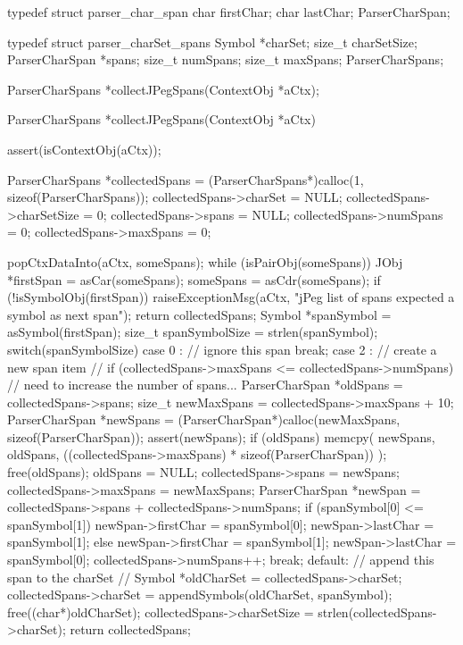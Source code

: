 
\startCHeader
typedef struct parser_char_span {
  char firstChar;
  char lastChar;
} ParserCharSpan;

typedef struct parser_charSet_spans {
  Symbol         *charSet;
  size_t          charSetSize;
  ParserCharSpan *spans;
  size_t          numSpans;
  size_t          maxSpans;
} ParserCharSpans;

ParserCharSpans *collectJPegSpans(ContextObj *aCtx);
\stopCHeader

\startCCode
ParserCharSpans *collectJPegSpans(ContextObj *aCtx) {
  assert(isContextObj(aCtx));
  
  ParserCharSpans *collectedSpans = 
    (ParserCharSpans*)calloc(1, sizeof(ParserCharSpans));
  collectedSpans->charSet     = NULL;
  collectedSpans->charSetSize = 0;
  collectedSpans->spans       = NULL;
  collectedSpans->numSpans    = 0;
  collectedSpans->maxSpans    = 0;
  
  popCtxDataInto(aCtx, someSpans);
  while (isPairObj(someSpans)) {
    JObj *firstSpan = asCar(someSpans);
    someSpans       = asCdr(someSpans);
    if (!isSymbolObj(firstSpan)) {
      raiseExceptionMsg(aCtx,
        "jPeg list of spans expected a symbol as next span");
      return collectedSpans; 
    }
    Symbol *spanSymbol     = asSymbol(firstSpan);
    size_t  spanSymbolSize = strlen(spanSymbol);
    switch(spanSymbolSize) {
      case 0 :
        // ignore this span
        break;
      case 2 :
        // create a new span item
        //
        if (collectedSpans->maxSpans <= collectedSpans->numSpans) {
          // need to increase the number of spans...
          ParserCharSpan *oldSpans = collectedSpans->spans;
          size_t newMaxSpans       = collectedSpans->maxSpans + 10;
          ParserCharSpan *newSpans =
            (ParserCharSpan*)calloc(newMaxSpans, sizeof(ParserCharSpan));
          assert(newSpans);
          if (oldSpans) {
            memcpy(
              newSpans,
              oldSpans,
              ((collectedSpans->maxSpans) * sizeof(ParserCharSpan))
            );
            free(oldSpans);
            oldSpans = NULL;
          }
          collectedSpans->spans    = newSpans;
          collectedSpans->maxSpans = newMaxSpans;
        }
        ParserCharSpan *newSpan =
          collectedSpans->spans + collectedSpans->numSpans;
        if (spanSymbol[0] <= spanSymbol[1]) {
          newSpan->firstChar = spanSymbol[0];
          newSpan->lastChar  = spanSymbol[1];
        } else {
          newSpan->firstChar = spanSymbol[1];
          newSpan->lastChar  = spanSymbol[0];
        }
        collectedSpans->numSpans++;
        break;
      default: {
        // append this span to the charSet
        //
        Symbol *oldCharSet = collectedSpans->charSet;
        collectedSpans->charSet =
          appendSymbols(oldCharSet, spanSymbol);
        free((char*)oldCharSet);
        collectedSpans->charSetSize = strlen(collectedSpans->charSet);
      }
    }
  }
  return collectedSpans;
}
\stopCCode


